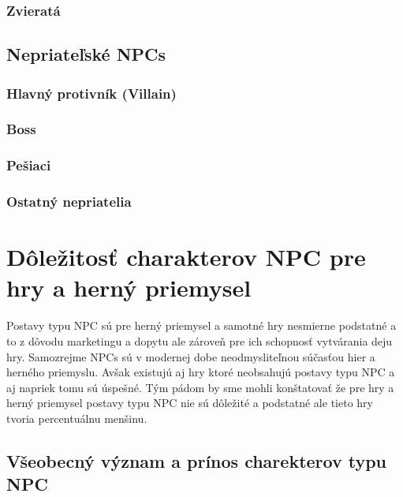 \documentclass[10pt,twoside,slovak,a4paper]{article}
\begin{document}
\subsubsection{Zvieratá}

\subsection{Nepriateľské NPCs} \label{enemy}

\subsubsection{Hlavný protivník (Villain)} \label{BOSS}

\subsubsection{Boss} \label{BOSS}

\subsubsection{Pešiaci} \label{Pesiaci}

\subsubsection{Ostatný nepriatelia} \label{Pesiaci}


\section{Dôležitosť charakterov NPC pre hry a herný priemysel}   \label{Dolezitost}

Postavy typu NPC sú pre herný priemysel a samotné hry nesmierne podstatné a to z dôvodu marketingu a dopytu ale zároveň pre ich schopnosť vytvárania deju hry. Samozrejme NPCs sú v modernej dobe neodmysliteľnou súčasťou hier a herného priemyslu. Avšak existujú aj hry ktoré neobsahujú postavy typu NPC a aj napriek tomu sú úspešné. Tým pádom by sme mohli konštatovať že pre hry a herný priemysel postavy typu NPC nie sú dôležité a podstatné ale tieto hry tvoria percentuálnu menšinu.%

\subsection{Všeobecný význam a prínos charekterov typu NPC}
\end{document}
